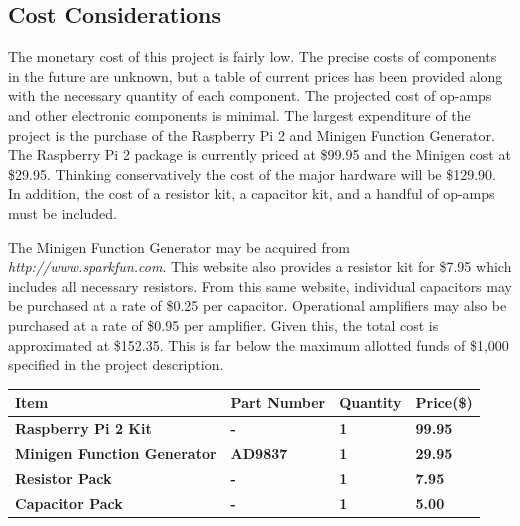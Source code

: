 \documentclass{article}	%
\begin{document}
\begin{multicols}{2}
\section{Cost Considerations}
The monetary cost of this project is fairly low. 
The precise costs of components in the future are unknown, but
a table 
of current prices has been provided
along with the necessary quantity of each component.
The projected cost of op-amps and other electronic components is minimal. 
The largest expenditure of the project is
the purchase of the 
Raspberry Pi 2 and 
Minigen Function Generator. 
The Raspberry Pi 2 package is currently priced at \$99.95 and
the Minigen cost at \$29.95.
Thinking conservatively the cost of the major hardware will be \$129.90. 
In addition, the cost of 
a resistor kit, 
a capacitor kit, and 
a handful of op-amps 
must be included.

The Minigen Function Generator may be acquired from 
\textit{http://www.sparkfun.com}.
This website also provides 
a resistor kit for \$7.95 
which includes all necessary resistors. 
From this same website,
individual capacitors may be purchased
at a rate of \$0.25 per capacitor.
Operational amplifiers may also be purchased at
a rate of \$0.95 per amplifier.
Given this,
the total cost is approximated at \$152.35. 
This is far below the maximum allotted funds of \$1,000
specified in the project description.

\begin{center}
    \begin{tabularx}{0.4\textwidth}{|X|X|X|X|}
        \hline

        \textbf{Item} &
        \textbf{Part Number} &
        \textbf{Quantity} &
        \textbf{Price(\$)} \\
        \hline

        \textbf{Raspberry Pi 2 Kit} &
        \textbf{-} &
        \textbf{1} &
        \textbf{99.95} \\
        \hline

        \textbf{Minigen Function Generator} &
        \textbf{AD9837} &
        \textbf{1} &
        \textbf{29.95} \\
        \hline

        \textbf{Resistor Pack} &
        \textbf{-} &
        \textbf{1} &
        \textbf{7.95} \\
        \hline

        \textbf{Capacitor Pack} &
        \textbf{-} &
        \textbf{1} &
        \textbf{5.00} \\
        \hline


\end{tabularx}
\end{center}
\end{multicols}
\end{document}
